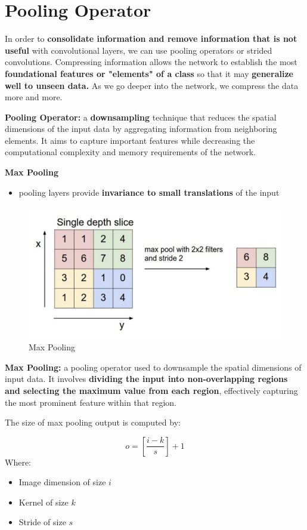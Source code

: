 \section{Pooling Operator}
In order to \textbf{consolidate information and remove information that is not useful} with convolutional layers, we can use pooling operators or strided convolutions. Compressing information allows the network to establish the most \textbf{foundational features or "elements" of a class} so that it may \textbf{generalize well to unseen data.} As we go deeper into the network, we compress the data more and more.

\begin{definition}
    \textbf{Pooling Operator:} a \textbf{downsampling} technique that reduces the spatial dimensions of the input data by aggregating information from neighboring elements. It aims to capture important features while decreasing the computational complexity and memory requirements of the network. 
\end{definition}

\textbf{Max Pooling}

\begin{itemize}
    \item pooling layers provide \textbf{invariance to small translations} of the input
\end{itemize}
\begin{figure}[h!t]
    \centering
    \includegraphics[width=0.5\linewidth]{maxpooling.png}
    \caption{Max Pooling}
    \label{fig:enter-label}
\end{figure}

\begin{definition}
    \textbf{Max Pooling:} a pooling operator used to downsample the spatial dimensions of input data. It involves \textbf{dividing the input into non-overlapping regions and selecting the maximum value from each region}, effectively capturing the most prominent feature within that region.
\end{definition}

\begin{theorem}
    The size of max pooling output is computed by:

\[o = [\frac{i - k}{s}] + 1\]
Where:
\begin{itemize}
    \item Image dimension of size \( i \)
    \item  Kernel of size \( k \)
    \item Stride of size \(s\)
\end{itemize}
\end{theorem}


